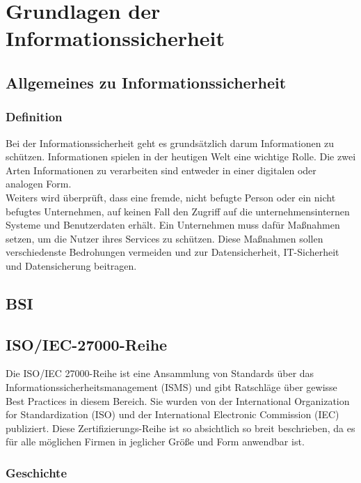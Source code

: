 \chapter{Grundlagen der Informationssicherheit}
\strahlhofer

\section{Allgemeines zu Informationssicherheit}
\subsection{Definition}
Bei der Informationssicherheit geht es grundsätzlich darum Informationen zu schützen. Informationen spielen in der heutigen Welt eine wichtige Rolle. Die zwei Arten Informationen zu verarbeiten sind entweder in einer digitalen oder analogen Form. 
\\
Weiters wird überprüft, dass eine fremde, nicht befugte Person oder ein nicht befugtes Unternehmen, auf keinen Fall den Zugriff auf die unternehmensinternen Systeme und Benutzerdaten erhält. Ein Unternehmen muss dafür Maßnahmen setzen, um die Nutzer ihres Services zu schützen. Diese Maßnahmen sollen verschiedenste Bedrohungen vermeiden und zur Datensicherheit, IT-Sicherheit und Datensicherung beitragen.
\\

\section{BSI}

\section{ISO/IEC-27000-Reihe}
Die ISO/IEC 27000-Reihe ist eine Ansammlung von Standards über das Informationssicherheitsmanagement (ISMS) und gibt Ratschläge über gewisse Best Practices in diesem Bereich. Sie wurden von der International Organization for Standardization (ISO) und der International Electronic Commission (IEC) publiziert. 
Diese Zertifizierungs-Reihe ist so absichtlich so breit beschrieben, da es für alle möglichen Firmen in jeglicher Größe und Form anwendbar ist.

\subsection{Geschichte}



